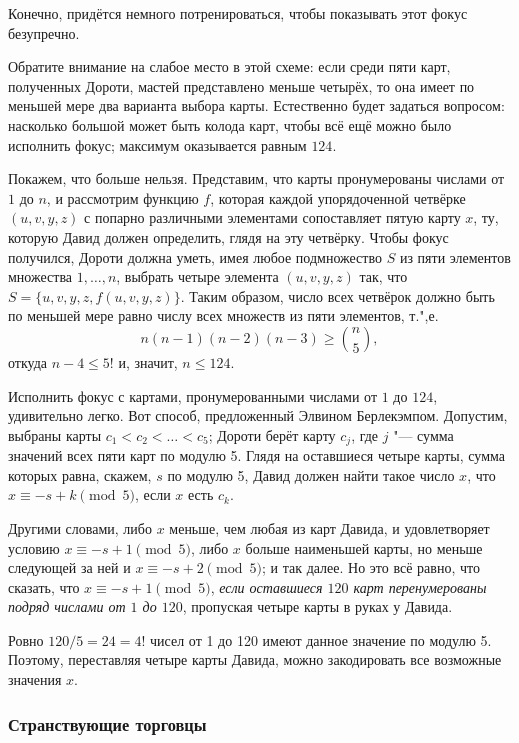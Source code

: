\documentclass[twoside]{book}
\begin{document}
Конечно, придётся немного потренироваться, чтобы показывать этот фокус безупречно.

\medskip

Обратите внимание на слабое место в этой схеме: если среди пяти карт, полученных Дороти, мастей представлено меньше четырёх, то она имеет по меньшей мере два варианта выбора карты.
Естественно будет задаться вопросом: насколько большой может быть колода карт, чтобы всё ещё можно было исполнить фокус;
максимум оказывается равным $124$.

Покажем, что больше нельзя.
Представим, что карты
пронумерованы числами от $1$ до $n$, и
рассмотрим функцию $f$, которая каждой упорядоченной четвёрке
$(u,v,y,z)$ с попарно различными элементами сопоставляет пятую карту
$x$, ту, которую Давид должен определить, глядя на эту четвёрку.
Чтобы фокус получился, Дороти должна уметь, имея любое
подмножество $S$ из пяти элементов множества
${1, \dots, n}$, выбрать четыре элемента $(u,v,y,z)$ так, что
$S = \{u,v,y,z, f(u,v,y,z)\}$.  Таким образом, число всех четвёрок
должно быть по меньшей мере равно числу всех
множеств из пяти элементов, т.",е.
\[n(n - 1)(n - 2)(n - 3)\ge \binom n5,\]
откуда $n - 4 \le5!$ и, значит, $n\le 124$.


Исполнить фокус с картами, пронумерованными числами от $1$
до $124$, удивительно легко.  Вот способ, предложенный Элвином
Берлекэмпом.
Допустим, выбраны карты $c_1 < c_2 < \ldots < c_5$;
Дороти берёт карту $c_j$, где $j$ "--- сумма значений всех пяти карт
по модулю 5.
Глядя на оставшиеся четыре карты, сумма которых равна, скажем, $s$ по модулю 5, Давид должен найти такое число
$x$, что $x\equiv -s + k \pmod 5$, если $x$ есть
$c_k$.

Другими словами, либо $x$ меньше, чем любая из карт Давида, и
удовлетворяет условию $x\equiv-s + 1 \pmod 5$, либо $x$ больше наименьшей
карты, но меньше следующей за ней и $x\equiv -s + 2 \pmod 5$; и так
далее.  Но это всё равно, что сказать, что $x\equiv -s + 1 \pmod 5$,
\emph{если оставшиеся $120$ карт перенумерованы подряд числами от $1$ до $120$}, пропуская четыре карты в руках
у Давида.

Ровно $120/5 = 24 = 4!$ чисел от 1 до 120 имеют данное значение по модулю 5.
Поэтому, переставляя четыре карты Давида, можно закодировать все возможные значения $x$.
\heart

\subsubsection*{Странствующие торговцы} %
\end{document}
